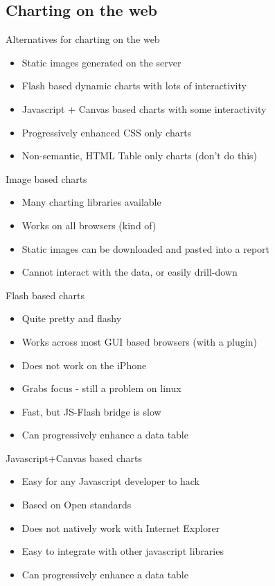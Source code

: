 \documentclass{beamer}
\begin{document}
\subsection{Charting on the web}

\begin{frame}{Alternatives for charting on the web}
  \begin{itemize}
  \item Static images generated on the server
  \item Flash based dynamic charts with lots of interactivity
  \item Javascript + Canvas based charts with some interactivity
  \item Progressively enhanced CSS only charts
  \item Non-semantic, HTML Table only charts (don't do this)
  \end{itemize}
\end{frame}

\begin{frame}{Image based charts}
  \begin{itemize}
  \item Many charting libraries available
  \item Works on all browsers (kind of)
  \item Static images can be downloaded and pasted into a report
  \item Cannot interact with the data, or easily drill-down
  \end{itemize}
\end{frame}

\begin{frame}{Flash based charts}
  \begin{itemize}
  \item Quite pretty and flashy
  \item Works across most GUI based browsers (with a plugin)
  \item Does not work on the iPhone
  \item Grabs focus - still a problem on linux
  \item Fast, but JS-Flash bridge is slow
  \item Can progressively enhance a data table
  \end{itemize}
\end{frame}

\begin{frame}{Javascript+Canvas based charts}
  \begin{itemize}
  \item Easy for any Javascript developer to hack
  \item Based on Open standards
  \item Does not natively work with Internet Explorer
  \item Easy to integrate with other javascript libraries
  \item Can progressively enhance a data table
  \end{itemize}
\end{frame}
\end{document}

